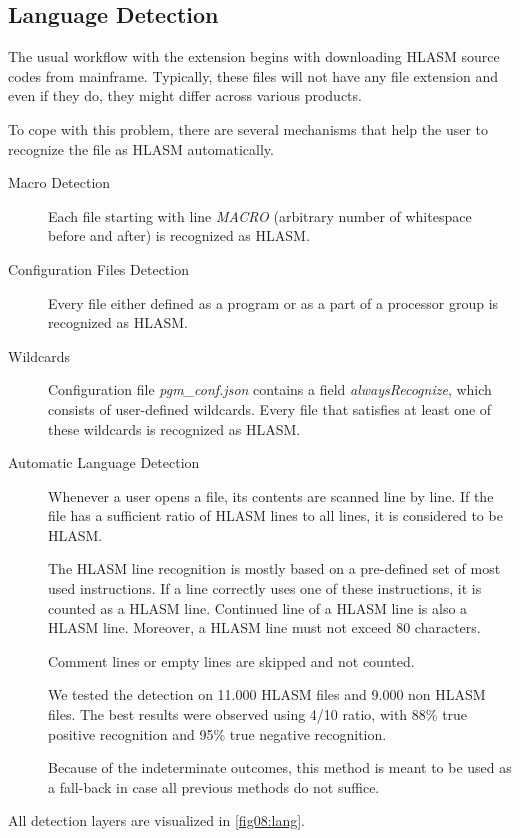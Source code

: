 \subsection{Language Detection}
\label{section:wildcard}
The usual workflow with the extension begins with downloading HLASM source codes from mainframe. Typically, these files will not have any file extension and even if they do, they might differ across various products.

To cope with this problem, there are several mechanisms that help the user to recognize the file as HLASM automatically.

\begin{description}
	\item[Macro Detection] Each file starting with line \emph{MACRO} (arbitrary number of whitespace before and after) is recognized as HLASM.
	\item[Configuration Files Detection] Every file either defined as a program or as a part of a processor group is recognized as HLASM.
	\item[Wildcards] Configuration file \emph{pgm\_conf.json} contains a field \emph{alwaysRecognize}, which consists of user-defined wildcards. Every file that satisfies at least one of these wildcards is recognized as HLASM.
	\item[Automatic Language Detection] Whenever a user opens a file, its contents are scanned line by line. If the file has a sufficient ratio of HLASM lines to all lines, it is considered to be HLASM.
	
	The HLASM line recognition is mostly based on a pre-defined set of most used instructions. If a line correctly uses one of these instructions, it is counted as a HLASM line. Continued line of a HLASM line is also a HLASM line.
	Moreover, a HLASM line must not exceed 80 characters.
	
	Comment lines or empty lines are skipped and not counted. 
	
	We tested the detection on 11.000 HLASM files and 9.000 non HLASM files. The best results were observed using 4/10 ratio, with 88\% true positive recognition and 95\% true negative recognition. 
	
	Because of the indeterminate outcomes, this method is meant to be used as a fall-back in case all previous methods do not suffice.
\end{description}

All detection layers are visualized in \cref{fig08:lang}.


